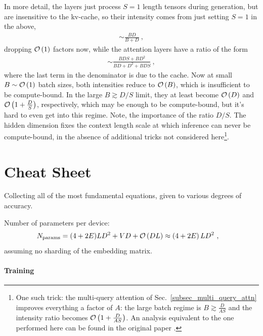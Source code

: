 \documentclass[11pt]{article}
\begin{document}
In more detail, the  layers just process $ S=1 $ length tensors during generation, but
are insensitive to the kv-cache, so their intensity comes from just setting $ S=1 $ in the above,
\begin{align}
   \sim \frac{ BD  }{ B + D } \ ,
\end{align}
dropping $\mathcal{O} \left( 1 \right)  $ factors now, while the attention layers have a ratio of the form
\begin{align}
    \sim \frac{ BDS+BD ^{ 2 } }{ BD + D ^{ 2 }+BDS }\ ,
\end{align}
where the last term in the denominator is due to the cache. Now at small $B \sim \mathcal{O} \left( 1
\right)  $ batch sizes, both intensities reduce to $ \mathcal{O} \left( B \right)  $, which is
insufficient to be compute-bound.  In the large $ B \gtrsim D/S $ limit, they at least become $ \mathcal{O} \left( D
\right)  $ and $ \mathcal{O} \left( 1 + \frac{ D }{ S } \right)  $, respectively, which may be enough to be
compute-bound, but it's hard to even get into this regime. Note, the importance of the ratio $ D/S
$. The hidden dimension fixes the context length scale at which inference can never be
compute-bound, in the absence of additional tricks not considered here\footnote{One such trick: the
    multi-query attention of Sec.~\ref{subsec_multi_query_attn} improves everything a factor of $
A $: the large batch regime is $ B \gtrsim \frac{ D }{ AS }$ and the intensity ratio becomes
$ \mathcal{O} \left( 1 + \frac{ D }{ AS } \right)  $. An analysis equivalent to the one performed here can be found in the original paper
\cite{shazeer2019fast}.}.


\section{Cheat Sheet \label{app_cheat_sheet}}

Collecting all of the most fundamental equations, given to various degrees of accuracy.

Number of parameters per device:
\begin{align}
    N _{ {\rm params} } &=   (4+2E)LD ^{ 2 } + VD+ \mathcal{O} \left( DL \right) \approx   \left ( 4+2E \right )LD ^{ 2 }\ ,
\end{align}
assuming no sharding of the embedding matrix.


\paragraph{Training}
\end{document}
